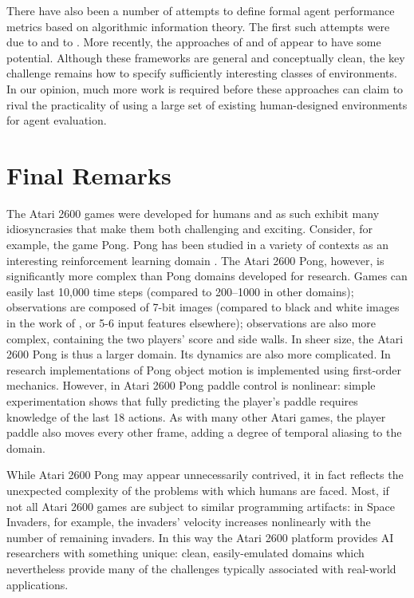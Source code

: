 \documentclass[twoside,11pt]{article}
\newcommand{\gamename}[1]{{\sc #1}}
\begin{document}
There have also been a number of attempts to define formal agent performance metrics based on algorithmic information theory.
The first such attempts were due to  and to .
More recently, the approaches of  and of  appear to have some potential.
Although these frameworks are general and conceptually clean, the key challenge remains how to specify sufficiently interesting classes of environments.
In our opinion, much more work is required before these approaches can claim to rival the practicality of using a large set of existing human-designed environments for agent evaluation.

\section{Final Remarks}
\label{sec:final-remarks}

The Atari 2600 games were developed for humans and as such exhibit many idiosyncrasies that make them both challenging and exciting. Consider, for example, the game \gamename{Pong}. \gamename{Pong} has been studied in a variety of contexts as an interesting reinforcement learning domain \cite{cobo2011,stober08pixels,monroy06coevolution}. The Atari 2600 \gamename{Pong}, however, is significantly more complex than \gamename{Pong} domains developed for research. Games can easily last 10,000 time steps (compared to 200--1000 in other domains); observations are composed of 7-bit  images (compared to  black and white images in the work of , or 5-6 input features elsewhere); observations are also more complex, containing the two players' score and side walls. In sheer size, the Atari 2600 \gamename{Pong} is thus a larger domain. Its dynamics are also more complicated.  In research implementations of \gamename{Pong} object motion is implemented using first-order mechanics.  However, in Atari 2600 \gamename{Pong} paddle control is nonlinear: simple experimentation shows that fully predicting the player's paddle requires knowledge of the last 18 actions. As with many other Atari games, the player paddle also moves every other frame, adding a degree of temporal aliasing to the domain. 

While Atari 2600 \gamename{Pong} may appear unnecessarily contrived, it in fact reflects the unexpected complexity of the problems with which humans are faced. Most, if not all Atari 2600 games are subject to similar programming artifacts: in \gamename{Space Invaders}, for example, the invaders' velocity increases nonlinearly with the number of remaining invaders. In this way the Atari 2600 platform provides AI researchers with something unique: clean, easily-emulated domains which nevertheless provide many of the challenges typically associated with real-world applications.
\end{document}
